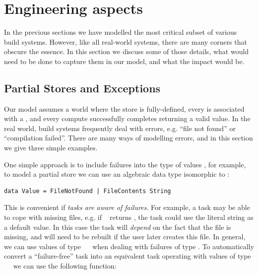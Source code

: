 \section{Engineering aspects}\label{sec-engineering}

In the previous sections we have modelled the most critical subset of various
build systems. However, like all real-world systems, there are many corners that
obscure the essence. In this section we discuss some of those details, what
would need to be done to capture them in our model, and what the impact would be.

\subsection{Partial Stores and Exceptions}\label{sec-failures}

Our model assumes a world where the store is fully-defined, every  is
associated with a , and every compute successfully completes returning a
valid value. In the real world, build systems frequently deal with errors, e.g.
``file not found'' or ``compilation failed''. There are many ways of modelling
errors, and in this section we give three simple examples.


One simple approach is to include failures into the type of values , for
example, to model a partial store we can use an algebraic data type isomorphic
to :

\vspace{1mm}
\begin{verbatim}
data Value = FileNotFound | FileContents String
\end{verbatim}
\vspace{1mm}

\noindent
This is convenient if \emph{tasks are aware of failures}. For example, a task
may be able to cope with missing files, e.g. if ~
returns , the task could use the literal string  as
a default value. In this case the task will \emph{depend} on the fact that the
file  is missing, and will need to be rebuilt if the user
later creates this file. In general, we can use values of type
~~ when dealing with failures of type . To
automatically convert a ``failure-free'' task into an equivalent task operating
with values of type ~~ we can use the following function:

